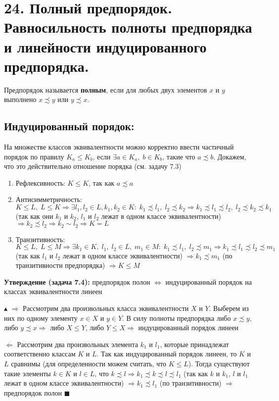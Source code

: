 \section*{24. Полный предпорядок. Равносильность полноты предпорядка и линейности индуцированного предпорядка.}
\par Предпорядок называется \textbf{полным}, если для любых двух элементов $x$ и $y$ выполнено $x \precsim y$ или $y \precsim x$.
\subsection*{Индуцированный порядок:}
\par На множестве классов эквивалентности можно корректно ввести частичный порядок по правилу $K_a \leq K_b$, если $\exists a \in K_a, \; b \in K_b$, такие что $a \precsim b$. Докажем, что это действительно отношение порядка (см. задачу 7.3)
\begin{enumerate}
    \item Рефлексивность: $K \leq K$, так как $a \precsim a$
    \item Антисимметричность: $K \leq L, \; L \leq K \Rightarrow \exists l_1, l_2 \in L, k_1, k_2 \in K: \; k_1 \precsim l_1, \; l_2 \precsim k_2 \Rightarrow k_1 \precsim l_1 \precsim l_2, \; l_2 \precsim k_2 \precsim k_1$ (так как они $k_1$ и $k_2$, $l_1$ и $l_2$ лежат в одном классе эквивалентности) $\Rightarrow k_2 \precsim l_2 \Rightarrow k_2 \sim l_2 \Rightarrow K=L$
    \item Транзитивность: $K \leq L, \; L \leq M \Rightarrow \exists k_1 \in K, \; l_1, \; l_2 \in L, \; m_1 \in M: \; k_1 \precsim l_1, \; l_2 \precsim m_1 \Rightarrow k_1 \precsim l_1 \precsim l_2 \precsim m_1$ (так как $l_1$ и $l_2$ лежат в одном классе эквивалентности) $\Rightarrow k_1 \precsim m_1$ (по транзитивности предпорядка) $\Rightarrow K \leq M$
\end{enumerate}
\par \textbf{Утверждение (задача 7.4):} предпорядок полон $\Leftrightarrow$ индуцированный порядок на классах эквивалентности линеен
\par $\blacktriangle$ $\Rightarrow$ Рассмотрим два произвольных класса эквивалентности $X$ и $Y$. Выберем из них по одному элементу $x \in X$ и $y \in Y$. В силу полноты предпорядка либо $x \precsim y$, либо $y \precsim x \Rightarrow$ либо $X \leq Y$, либо $Y \leq X \Rightarrow$ индуцированный порядок линеен 
\par $\Leftarrow$ Рассмотрим два произвольных элемента $k_1$ и $l_1$, которые принадлежат соответственно классам $K$ и $L$. Так как индуцированный порядок линеен, то $K$ и $L$ сравнимы (для определенности можем считать, что $K \leq L$). Тогда существуют такие элементы $k \in K$ и $l \in L$, что $k \precsim l \Rightarrow k_1 \precsim k \precsim l \precsim l_1$ (так как $k$ и $k_1$, $l$ и $l_1$ лежат в одном классе эквивалентности) $\Rightarrow k_1 \precsim l_1$ (по транзитивности) $\Rightarrow$ предпорядок полон $\blacksquare$